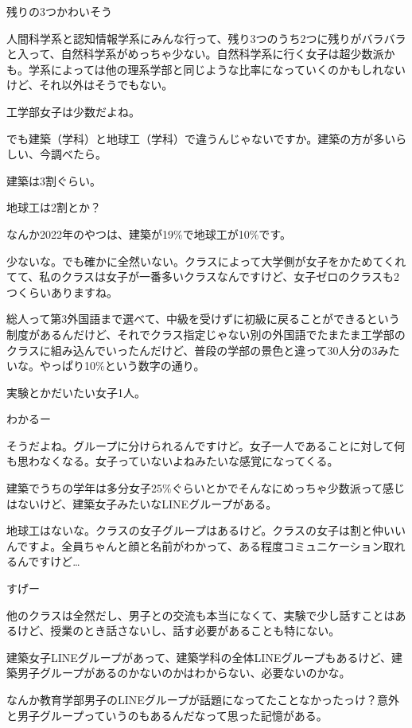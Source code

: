 \begin{multicols}{2}
  残りの3つかわいそう

  人間科学系と認知情報学系にみんな行って、残り3つのうち2つに残りがバラバラと入って、自然科学系がめっちゃ少ない。自然科学系に行く女子は超少数派かも。学系によっては他の理系学部と同じような比率になっていくのかもしれないけど、それ以外はそうでもない。



  工学部女子は少数だよね。

  でも建築（学科）と地球工（学科）で違うんじゃないですか。建築の方が多いらしい、今調べたら。

  建築は3割ぐらい。

  地球工は2割とか？

  なんか2022年のやつは、建築が19\%で地球工が10\%です。

  少ないな。でも確かに全然いない。クラスによって大学側が女子をかためてくれてて、私のクラスは女子が一番多いクラスなんですけど、女子ゼロのクラスも2つくらいありますね。

  総人って第3外国語まで選べて、中級を受けずに初級に戻ることができるという制度があるんだけど、それでクラス指定じゃない別の外国語でたまたま工学部のクラスに組み込んでいったんだけど、普段の学部の景色と違って30人分の3みたいな。やっぱり10\%という数字の通り。

  実験とかだいたい女子1人。

  わかるー

  そうだよね。グループに分けられるんですけど。女子一人であることに対して何も思わなくなる。女子っていないよねみたいな感覚になってくる。

  建築でうちの学年は多分女子25\%ぐらいとかでそんなにめっちゃ少数派って感じはないけど、建築女子みたいなLINEグループがある。

  地球工はないな。クラスの女子グループはあるけど。クラスの女子は割と仲いいんですよ。全員ちゃんと顔と名前がわかって、ある程度コミュニケーション取れるんですけど…

  すげー

  他のクラスは全然だし、男子との交流も本当になくて、実験で少し話すことはあるけど、授業のとき話さないし、話す必要があることも特にない。

  建築女子LINEグループがあって、建築学科の全体LINEグループもあるけど、建築男子グループがあるのかないのかはわからない、必要ないのかな。

  なんか教育学部男子のLINEグループが話題になってたことなかったっけ？意外と男子グループっていうのもあるんだなって思った記憶がある。


\end{multicols}
